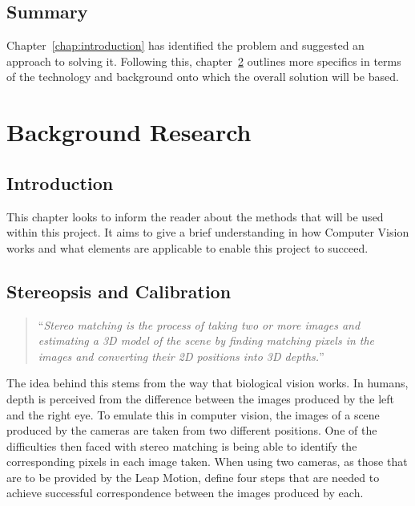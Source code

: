 \documentclass[11pt,oneside]{report}
\begin{document}
		\section{Summary}
		Chapter~\ref{chap:introduction} has identified the problem and suggested an approach to solving it.
		Following this, chapter~\ref{chap:background} outlines more specifics in terms of the technology and background onto which the overall solution will be based.
		
	\chapter{Background Research}\label{chap:background}
			\section{Introduction}
			This chapter looks to inform the reader about the methods that will be used within this project.
			It aims to give a brief understanding in how Computer Vision works and what elements are applicable to enable this project to succeed.
			\section{Stereopsis and Calibration}
			\begin{quote}
				``\textit{Stereo matching is the process of taking two or more images and estimating a 3D model of the scene by finding matching pixels in the images and converting their 2D positions into 3D depths.}''\cite{book:sam}
			\end{quote}
			The idea behind this stems from the way that biological vision works.
			In humans, depth is perceived from the difference between the images produced by the left and the right eye.
			To emulate this in computer vision, the images of a scene produced by the cameras are taken from two different positions.
			One of the difficulties then faced with stereo matching is being able to identify the corresponding pixels in each image taken.
			When using two cameras, as those that are to be provided by the Leap Motion,  define four steps that are needed to achieve successful correspondence between the images produced by each.
			
\end{document}
